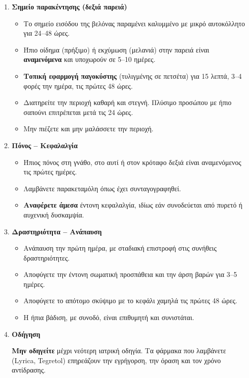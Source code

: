 \documentclass[10pt,greek]{article}
\begin{document}
\begin{enumerate}[label=\arabic*.]
\begin{itemize}
\item Στην περίπτωση αυτή απαιτούνται τεχνητά δάκρυα, προστατευτικά γυαλιά και οφθαλμολογική εκτίμηση.
\item Αναφέρετε άμεσα ερυθρότητα, πόνο ή θόλωση όρασης στον δεξιό οφθαλμό.
    \end{itemize}
  \item \textbf{Σημείο παρακέντησης (δεξιά παρειά)}
       \begin{itemize}
\item Το σημείο εισόδου της βελόνας παραμένει καλυμμένο με μικρό αυτοκόλλητο για 24--48 ώρες.
\item Ήπιο οίδημα (πρήξιμο) ή εκχύμωση (μελανιά) στην παρειά είναι \textbf{αναμενόμενα} και υποχωρούν σε 5--10 ημέρες.
\item \textbf{Τοπική εφαρμογή παγοκύστης} (τυλιγμένης σε πετσέτα) για 15 λεπτά, 3--4 φορές την ημέρα, τις πρώτες 48 ώρες.
\item Διατηρείτε την περιοχή καθαρή και στεγνή. Πλύσιμο προσώπου με ήπιο σαπούνι επιτρέπεται μετά τις 24 ώρες.
\item Μην πιέζετε και μην μαλάσσετε την περιοχή.
    \end{itemize}
  \item \textbf{Πόνος -- Κεφαλαλγία}
      \begin{itemize}
\item Ήπιος πόνος στη γνάθο, στο αυτί ή στον κρόταφο δεξιά είναι αναμενόμενος τις πρώτες ημέρες.
\item Λαμβάνετε παρακεταμόλη όπως έχει συνταγογραφηθεί.
\item \textbf{Αναφέρετε άμεσα} έντονη κεφαλαλγία, ιδίως εάν συνοδεύεται από πυρετό ή αυχενική δυσκαμψία.
    \end{itemize}
  \item \textbf{Δραστηριότητα -- Ανάπαυση}
      \begin{itemize}
\item Ανάπαυση την πρώτη ημέρα, με σταδιακή επιστροφή στις συνήθεις δραστηριότητες.
\item Αποφύγετε την έντονη σωματική προσπάθεια και την άρση βαρών για 3--5 ημέρες.
\item Αποφύγετε το απότομο σκύψιμο με το κεφάλι χαμηλά τις πρώτες 48 ώρες.
\item Η ήπια βάδιση, με συνοδό, είναι επιθυμητή και συνιστάται.
    \end{itemize}
  \item \textbf{Οδήγηση}

\textbf{Μην οδηγείτε} μέχρι νεότερη ιατρική οδηγία. Τα φάρμακα που λαμβάνετε (Lyrica, Tegretol) επηρεάζουν την εγρήγορση, την όραση και τον χρόνο αντίδρασης.
\end{enumerate}
\end{document}
